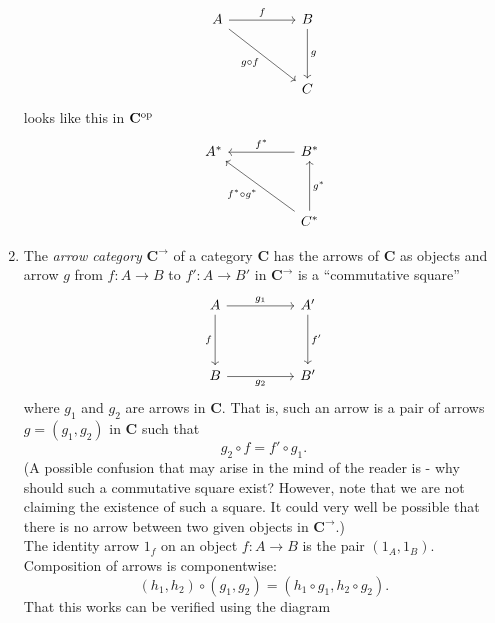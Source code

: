\begin{enumerate}
	\begin{equation*} 
		\begin{tikzcd}
			A \arrow[rr, "f"] \arrow[rrdd, "g\circ f"'] && B \arrow[dd, "g"]\\
			&&\\
			&& C
		\end{tikzcd}
	\end{equation*}
	looks like this in $\mathbf{C}^{\operatorname{op}}$
	\begin{equation*} 
		\begin{tikzcd}
			A^* && \arrow[ll, "f^*"'] B^* \\
			&&\\
			&& \arrow[lluu, "f^*\circ g^*"]\arrow[uu, "g^*"'] C^*
		\end{tikzcd}
	\end{equation*}
	\item The \emph{arrow category} $\mathbf{C}^\to$ of a category $\mathbf{C}$ has the arrows of $\mathbf{C}$ as objects and arrow $g$ from $f:A\to B$ to $f':A\to B'$ in $\mathbf{C}^\to$ is a ``commutative square''
	\begin{equation*} 
		\begin{tikzcd}
		A \arrow[dd, "f"'] \arrow[rr, "g_1"] &  & A' \arrow[dd, "f'"] \\
		                                     &  &                     \\
		B \arrow[rr, "g_2"']                 &  & B'                 
		\end{tikzcd}
	\end{equation*}
	where $g_1$ and $g_2$ are arrows in $\mathbf{C}.$ That is, such an arrow is a pair of arrows $g = (g_1, g_2)$ in $\mathbf{C}$ such that
	\begin{equation*} 
		g_2\circ f = f'\circ g_1.
	\end{equation*}
	(A possible confusion that may arise in the mind of the reader is - why should such a commutative square exist? However, note that we are not claiming the existence of such a square. It could very well be possible that there is no arrow between two given objects in $\mathbf{C}^\to$.)\\
	The identity arrow $1_f$ on an object $f:A\to B$ is the pair $(1_A, 1_B).$\\
	Composition of arrows is componentwise:
	\begin{equation*} 
		(h_1, h_2)\circ (g_1, g_2) = (h_1\circ g_1, h_2\circ g_2).
	\end{equation*}
	That this works can be verified using the diagram
	\begin{equation*} 

\end{equation*}
\end{enumerate}
